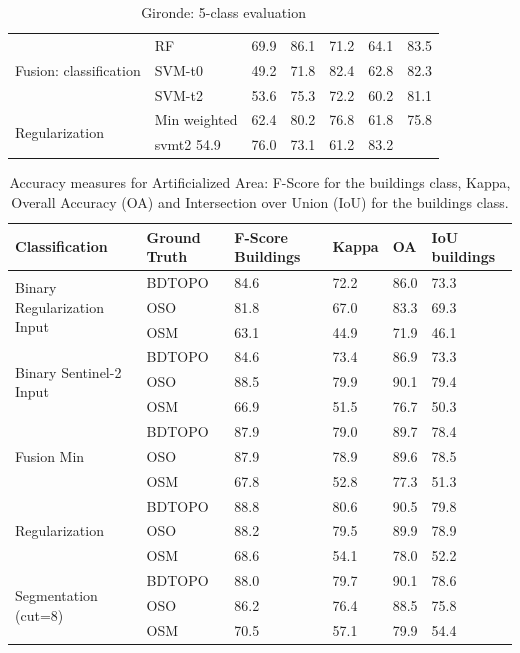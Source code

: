 \documentclass[10pt]{article}
\newcommand{\region}{finistere}
\begin{document}
\begin{table}[H]
\begin{tabular}{p{1.8cm}llllll}
		\multirow{3}{*}{\parbox{1.8cm}{Fusion: classification}} & RF & 69.9 & 86.1 & 71.2 & 64.1 & 83.5 \\
		& SVM-t0 & 49.2 & 71.8 & 82.4 & 62.8 & 82.3 \\
		& SVM-t2 & 53.6 & 75.3 & 72.2 & 60.2 & 81.1 \\\hline
		\multirow{2}{*}{Regularization} 		& Min weighted & 62.4 & 80.2 & 76.8 & 61.8 & 75.8 \\
		& svmt2 54.9 & 76.0 & 73.1 & 61.2 & 83.2 \\
	\bottomrule
	\end{tabular}
	\caption{Gironde: 5-class evaluation}
	\label{table:eval\region}
\end{table}

\begin{table}[H]
	\centering
	\begin{tabular}{llp{1.5cm}llp{1.5cm}}
		\toprule
		\textbf{Classification} & \textbf{Ground Truth} & \textbf{F-Score Buildings} & \textbf{Kappa} & \textbf{OA} & \textbf{IoU buildings}		\\\hline
		\multirow{3}{*}{Binary Regularization Input}& BDTOPO & 84.6 & 72.2 & 86.0 & 73.3 \\
		& OSO & 81.8 & 67.0 & 83.3 & 69.3 \\
		& OSM & 63.1 & 44.9 & 71.9 & 46.1 \\\hline
		\multirow{3}{*}{Binary Sentinel-2 Input}& BDTOPO & 84.6 & 73.4 & 86.9 & 73.3 \\
		& OSO & 88.5 & 79.9 & 90.1 & 79.4 \\
		& OSM & 66.9 & 51.5 & 76.7 & 50.3 \\\hline
		\multirow{3}{*}{Fusion Min}& BDTOPO & 87.9 & 79.0 & 89.7 & 78.4 \\
		& OSO & 87.9 & 78.9 & 89.6 & 78.5 \\
		& OSM & 67.8 & 52.8 & 77.3 & 51.3 \\\hline
		\multirow{3}{*}{Regularization}& BDTOPO & 88.8 & 80.6 & 90.5 & 79.8 \\
		& OSO & 88.2 & 79.5 & 89.9 & 78.9 \\
		& OSM & 68.6 & 54.1 & 78.0 & 52.2 \\\hline
		\multirow{3}{*}{Segmentation (cut=8)}& BDTOPO & 88.0 & 79.7 & 90.1 & 78.6 \\
		& OSO & 86.2 & 76.4 & 88.5 & 75.8 \\
		& OSM & 70.5 & 57.1 & 79.9 & 54.4 \\
		\bottomrule
	\end{tabular}
	\caption{Accuracy measures for Artificialized Area: F-Score for the buildings class, Kappa, Overall Accuracy (OA) and Intersection over Union (IoU) for the buildings class.}
	\label{table:accuracy-bin\region}
\end{table}
\end{document}
